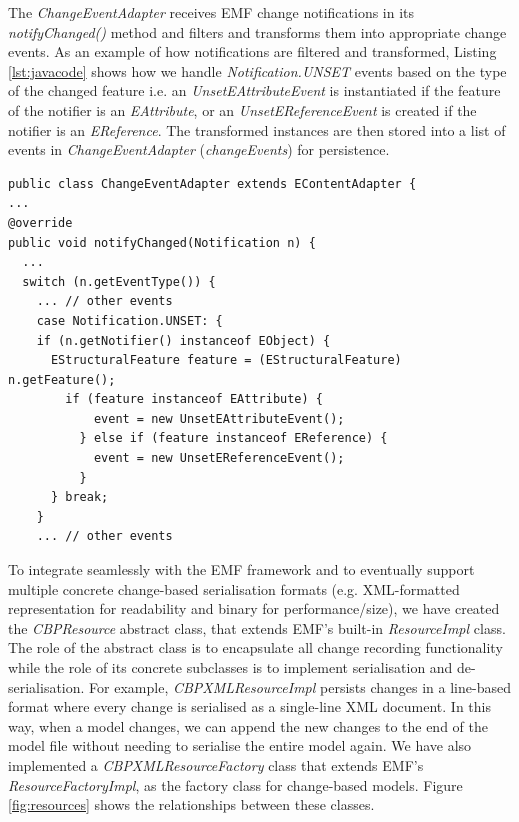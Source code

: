 \documentclass{llncs}
\begin{document}
The \emph{ChangeEventAdapter} receives EMF change notifications in its \emph{notifyChanged()} method and filters and transforms them into appropriate change events. As an example of how notifications are filtered and transformed, Listing \ref{lst:javacode} shows how we handle \emph{Notification.UNSET} events based on the type of the changed feature i.e. an \emph{UnsetEAttributeEvent} is instantiated if the feature of the notifier is an \emph{EAttribute}, or an \emph{UnsetEReferenceEvent}  is created if the notifier is an \emph{EReference}. The transformed instances are then stored into a list of events in \emph{ChangeEventAdapter} (\emph{changeEvents}) for persistence. 

\begin{lstlisting}[style=java,caption={Simplified Java code to handle notification events.},label=lst:javacode]
public class ChangeEventAdapter extends EContentAdapter {
...
@override
public void notifyChanged(Notification n) {
  ...
  switch (n.getEventType()) {
    ... // other events
    case Notification.UNSET: {
    if (n.getNotifier() instanceof EObject) {
      EStructuralFeature feature = (EStructuralFeature) n.getFeature();
        if (feature instanceof EAttribute) {
            event = new UnsetEAttributeEvent();
          } else if (feature instanceof EReference) {
            event = new UnsetEReferenceEvent();
          }
      } break;
    } 
    ... // other events
\end{lstlisting}	

To integrate seamlessly with the EMF framework and to eventually support multiple concrete change-based serialisation formats (e.g. XML-formatted representation for readability and binary for performance/size), we have created the \emph{CBPResource} abstract class, that extends EMF's built-in \emph{ResourceImpl} class. The role of the abstract class is to encapsulate all change recording functionality while the role of its concrete subclasses is to implement serialisation and de-serialisation. For example, \emph{CBPXMLResourceImpl} persists changes in a line-based format where every change is serialised as a single-line XML document. In this way, when a model changes, we can append the new changes to the end of the model file without needing to serialise the entire model again. We have also implemented a \emph{CBPXMLResourceFactory} class that extends EMF's \emph{ResourceFactoryImpl}, as the factory class for change-based models. Figure \ref{fig:resources} shows the relationships between these classes.
\end{document}
